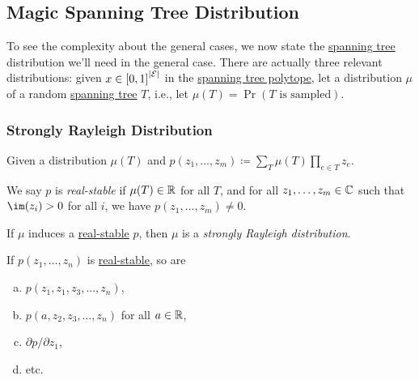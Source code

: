 \subsection{Magic Spanning Tree Distribution}
To see the complexity about the general cases, we now state the \hyperref[def:spanning-tree]{spanning tree} distribution we'll need in the general case. There are actually three relevant distributions: given \(x\in \left[ 0, 1 \right] ^{\left\vert \mathcal{\MakeUppercase{e}}  \right\vert }\) in the \hyperref[eq:spanning-tree-polytope]{spanning tree polytope}, let a distribution \(\mu \) of a random \hyperref[def:spanning-tree]{spanning tree} \(T\), i.e., let \(\mu (T) = \Pr(T\text{ is sampled})\).

\subsubsection{Strongly Rayleigh Distribution}
\begin{definition*}
	Given a distribution \(\mu (T)\) and \(p(z_1, \ldots , z_m ) \coloneqq \sum_{T} \mu (T) \prod_{e\in T} z_e\).
	\begin{definition}\label{def:real-stable}
		We say \(p\) is \emph{real-stable} if \(\mu (T)\in \mathbb{\MakeUppercase{r}} \) for all \(T\), and for all \(z_1, \ldots  , z_m\in \mathbb{\MakeUppercase{c}} \) such that \(\im(z_i) > 0\) for all \(i\), we have \(p(z_1, \ldots , z_m ) \neq 0\).
	\end{definition}
	\begin{definition}\label{def:strongly-Rayleigh-distribution}
		If \(\mu \) induces a \hyperref[def:real-stable]{real-stable} \(p\), then \(\mu\) is a \emph{strongly Rayleigh distribution}.
	\end{definition}
\end{definition*}

\begin{remark}[Closure]
	If \(p(z_1, \ldots , z_n )\) is \hyperref[def:real-stable]{real-stable}, so are
	\begin{enumerate}[(a)]
		\item \(p(z_1, z_1, z_3, \ldots , z_n )\),
		\item \(p(a, z_2, z_3, \ldots , z_n )\) for all \(a\in \mathbb{\MakeUppercase{r}}\),
		\item \(\partial p / \partial z_1\),
		\item etc.
	\end{enumerate}
\end{remark}

